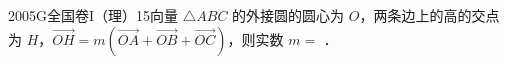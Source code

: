 
\begin{problem}{2005}{G}{全国卷I（理）}{15}{向量}
$ \triangle ABC $ 的外接圆的圆心为 $ O $，两条边上的高的交点为 $ H $，$ \overrightarrow{OH}=m(\overrightarrow{OA}+\overrightarrow{OB}+\overrightarrow{OC}) $，则实数 $ m= $ \underline{\hspace{4em}}．
\end{problem}

\begin{answer}

\end{answer}

\begin{solutions}

\end{solutions}